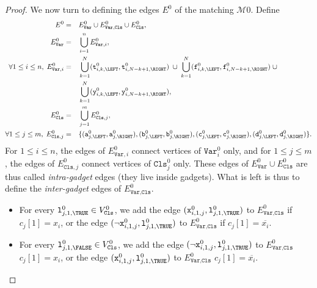 \begin{proof}
    We now turn to defining the edges $E^{0}$ of the matching $\mathcal{M}{0}$.
    Define
    \begin{alignat*}{2}
      E^{0} &=&& E^{0}_{\texttt{Var}} \cup E^{0}_{\texttt{Var},\texttt{Cls}} \cup E^{0}_{\texttt{Cls}},
      \\
      E^{0}_{\texttt{Var}} &=&& \bigcup_{i=1}^{n} E^{0}_{\texttt{Var}, i},
      \\
      \forall 1\leq i \leq n,\;
      E^{0}_{\texttt{Var}, i} &=&&
      \bigcup_{k=1}^{N} (\texttt{t}^{0}_{i,k,\LEFT}, \texttt{t}^{0}_{i,N-k+1,\RIGHT})
      \;\cup\;
      \bigcup_{k=1}^{N} (\texttt{f}^{0}_{i,k,\LEFT}, \texttt{f}^{0}_{i,N-k+1,\RIGHT}) \;\cup
      \\
      &&&
      \bigcup_{k=1}^{N} (\texttt{y}^{0}_{i,k,\LEFT}, \texttt{y}^{0}_{i,N-k+1,\RIGHT}),
      \\
      E^{0}_{\texttt{Cls}} &=&& \bigcup_{j=1}^{m} E^{0}_{\texttt{Cls}, j},
      \\
      \forall 1\leq j \leq m,\;
      E^{0}_{\texttt{Cls}, j} &=&&
      \{(\texttt{a}^{0}_{j,\LEFT}, \texttt{a}^{0}_{j,\RIGHT}),
      (\texttt{b}^{0}_{j,\LEFT}, \texttt{b}^{0}_{j,\RIGHT}),
      (\texttt{c}^{0}_{j,\LEFT}, \texttt{c}^{0}_{j,\RIGHT}),
      (\texttt{d}^{0}_{j,\LEFT}, \texttt{d}^{0}_{j,\RIGHT})\}\text{.}
    \end{alignat*}
    For $1 \leq i \leq n$, the edges of $E^{0}_{\texttt{Var}, i}$ connect
    vertices of $\texttt{Var}^{0}_{i}$ only, and
    for $1 \leq j \leq m$, the edges of $E^{0}_{\texttt{Cls}, j}$ connect
    vertices of $\texttt{Cls}^{0}_{j}$ only.
    These edges of $E^{0}_{\texttt{Var}} \cup E^{0}_{\texttt{Cls}}$ are thus called
    \emph{intra-gadget} edges (they live inside gadgets).
    What is left is thus to define the \emph{inter-gadget} edges of
    $E^{0}_{\texttt{Var},\texttt{Cls}}$.
    \begin{itemize}
      \item
      For every $\texttt{l}^{0}_{j, 1, \TRUE} \in V^{0}_{\texttt{Cls}}$,
      we add
      the edge $(\texttt{x}^{0}_{i,1,j}, \texttt{l}^{0}_{j, 1, \TRUE})$
      to $E^{0}_{\texttt{Var},\texttt{Cls}}$
      if $c_{j}[1] = x_{i}$, or
      the edge $(\neg\texttt{x}^{0}_{i,1,j}, \texttt{l}^{0}_{j, 1, \TRUE})$
      to $E^{0}_{\texttt{Var},\texttt{Cls}}$
      if $c_{j}[1] = \overline{x_{i}}$.

      \item
      For every $\texttt{l}^{0}_{j, 1, \FALSE} \in V^{0}_{\texttt{Cls}}$,
      we add
      the edge $(\neg\texttt{x}^{0}_{i,1,j}, \texttt{l}^{0}_{j, 1, \TRUE})$
      to $E^{0}_{\texttt{Var},\texttt{Cls}}$
      $c_{j}[1] = x_{i}$, or
      the edge $(\texttt{x}^{0}_{i,1,j}, \texttt{l}^{0}_{j, 1, \TRUE})$
      to $E^{0}_{\texttt{Var},\texttt{Cls}}$
      $c_{j}[1] = \overline{x_{i}}$.


\end{itemize}
\end{proof}
